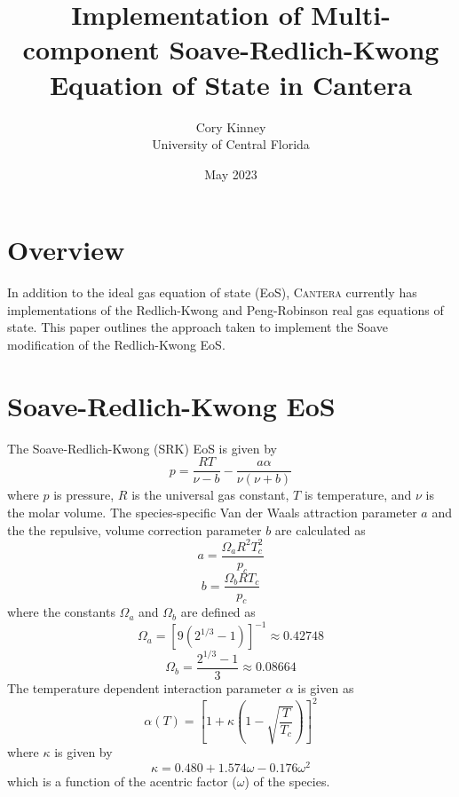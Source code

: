 \documentclass{article}
\title{Implementation of Multi-component Soave-Redlich-Kwong Equation of State in Cantera}
\author{Cory Kinney \\ University of Central Florida}
\date{May 2023}
\begin{document}
\maketitle


\section{Overview}
In addition to the ideal gas equation of state (EoS), \textsc{Cantera} \cite{cantera} currently has implementations of the Redlich-Kwong \cite{redlichkwong} and Peng-Robinson \cite{peng1976new} real gas equations of state. This paper outlines the approach taken to implement the Soave modification \cite{soave1972equilibrium} of the Redlich-Kwong EoS. 

 

\section{Soave-Redlich-Kwong EoS}
The Soave-Redlich-Kwong (SRK) EoS is given by
\begin{equation}
p = \frac{RT}{\nu-b}-\frac{a\alpha}{\nu(\nu+b)}\label{eq:SRK}
\end{equation}
where $p$ is pressure, $R$ is the universal gas constant, $T$ is temperature, and $\nu$ is the molar volume. The species-specific Van der Waals attraction parameter $a$ and the the repulsive, volume correction parameter $b$ are calculated as
\begin{equation}
    a = \frac{\Omega_a R^2 T_c^2}{p_c}\label{eq:a}
\end{equation}
\begin{equation}
    b = \frac{\Omega_b R T_c}{p_c}\label{eq:b}
\end{equation}
where the constants $\Omega_a$ and $\Omega_b$ are defined as
\begin{equation}
    \Omega_a = \left[9(2^{1/3}-1)\right]^{-1} \approx 0.42748
\end{equation}
\begin{equation}
    \Omega_b = \frac{2^{1/3}-1}{3} \approx 0.08664
\end{equation}
The temperature dependent interaction parameter $\alpha$ is given as
\begin{equation}
    \alpha(T) = \left[1 + \kappa\left(1 - \sqrt{\frac{T}{T_c}}\right)\right]^2 \label{eq:alpha}
\end{equation}
where $\kappa$ is given by
\begin{equation}
    \kappa = 0.480 + 1.574\omega - 0.176\omega^2
\end{equation}
which is a function of the acentric factor ($\omega$) of the species.
\end{document}
